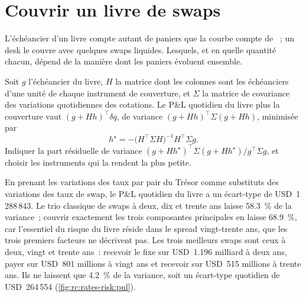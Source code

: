 \section{Couvrir un livre de swaps}

L'échéancier d'un livre compte autant de paniers que la courbe compte de ~; un desk le
couvre avec quelques swaps liquides. Lesquels, et en quelle quantité chacun, dépend de la
manière dont les paniers évoluent ensemble.

\begin{method}\label{met:rc:rates-risk:mvhedge}
Soit $g$ l'échéancier du livre, $H$ la matrice dont les colonnes sont les échéanciers
d'une unité de chaque instrument de couverture, et $\Sigma$ la matrice de covariance des
variations quotidiennes des cotations. Le P\&L quotidien du livre plus la couverture vaut $(g+Hh)^\top\delta q$, de variance
$(g+Hh)^\top\Sigma(g+Hh)$, minimisée par
\[
h^\star = -\bigl(H^\top\Sigma H\bigr)^{-1}H^\top\Sigma g .
\]
Indiquer la part résiduelle de variance $(g+Hh^\star)^\top\Sigma(g+Hh^\star) /
g^\top\Sigma g$, et choisir les instruments qui la rendent la plus petite.
\end{method}

\label{lst:rc:rates-risk:hedge}

\begin{example}\label{ex:rc:rates-risk:hedge}
En prenant les variations des taux par pair du Trésor comme substituts des variations
des taux de swap, le P\&L quotidien du livre a un écart-type de USD~1\,288\,843. Le trio
classique de swaps à deux, dix et trente ans laisse 58.3~\% de la variance~; couvrir exactement les trois
composantes principales en laisse 68.9~\%, car l'essentiel du risque du livre
réside dans le spread vingt-trente ans, que les trois premiers facteurs ne décrivent
pas. Les trois meilleurs swaps sont ceux à deux, vingt et trente ans~:
recevoir le fixe sur USD~1.196 milliard à deux ans, payer sur USD~801 millions à
vingt ans et recevoir sur USD~515 millions à trente ans. Ils ne laissent que 4.2~\%
de la variance, soit un écart-type quotidien de USD~264\,554
(\cref{fig:rc:rates-risk:pnl}).
\end{example}

